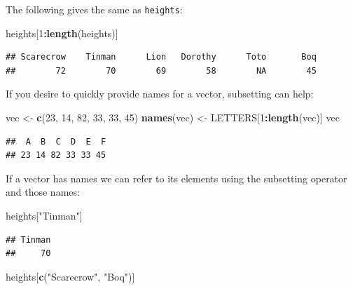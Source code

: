 \documentclass[]{book}
\makeatletter
\newenvironment{Shaded}{\begin{snugshade}}{\end{snugshade}}
\newcommand{\KeywordTok}[1]{\textcolor[rgb]{0.13,0.29,0.53}{\textbf{#1}}}
\newcommand{\DecValTok}[1]{\textcolor[rgb]{0.00,0.00,0.81}{#1}}
\newcommand{\StringTok}[1]{\textcolor[rgb]{0.31,0.60,0.02}{#1}}
\newcommand{\OperatorTok}[1]{\textcolor[rgb]{0.81,0.36,0.00}{\textbf{#1}}}
\newcommand{\NormalTok}[1]{#1}
\newenvironment{kframe}{%
\medskip{}
\setlength{\fboxsep}{.8em}
 \def\at@end@of@kframe{}%
 \ifinner\ifhmode%
  \def\at@end@of@kframe{\end{minipage}}%
  \begin{minipage}{\columnwidth}%
 \fi\fi%
 \def\FrameCommand##1{\hskip\@totalleftmargin \hskip-\fboxsep
 \colorbox{shadecolor}{##1}\hskip-\fboxsep
     \hskip-\linewidth \hskip-\@totalleftmargin \hskip\columnwidth}%
 \MakeFramed {\advance\hsize-\width
   \@totalleftmargin\z@ \linewidth\hsize
   \@setminipage}}%
 {\par\unskip\endMakeFramed%
 \at@end@of@kframe}
\renewenvironment{Shaded}{\begin{kframe}}{\end{kframe}}
\theoremstyle{definition}
\theoremstyle{definition}
\theoremstyle{definition}
\theoremstyle{remark}
\makeatother
\begin{document}
The following gives the same as \texttt{heights}:

\begin{Shaded}
\begin{Highlighting}[]
\NormalTok{heights[}\DecValTok{1}\OperatorTok{:}\KeywordTok{length}\NormalTok{(heights)]}
\end{Highlighting}
\end{Shaded}

\begin{verbatim}
## Scarecrow    Tinman      Lion   Dorothy      Toto       Boq 
##        72        70        69        58        NA        45
\end{verbatim}

If you desire to quickly provide names for a vector, subsetting can
help:

\begin{Shaded}
\begin{Highlighting}[]
\NormalTok{vec <-}\StringTok{ }\KeywordTok{c}\NormalTok{(}\DecValTok{23}\NormalTok{, }\DecValTok{14}\NormalTok{, }\DecValTok{82}\NormalTok{, }\DecValTok{33}\NormalTok{, }\DecValTok{33}\NormalTok{, }\DecValTok{45}\NormalTok{)}
\KeywordTok{names}\NormalTok{(vec) <-}\StringTok{ }\NormalTok{LETTERS[}\DecValTok{1}\OperatorTok{:}\KeywordTok{length}\NormalTok{(vec)]}
\NormalTok{vec}
\end{Highlighting}
\end{Shaded}

\begin{verbatim}
##  A  B  C  D  E  F 
## 23 14 82 33 33 45
\end{verbatim}

If a vector has names we can refer to its elements using the subsetting
operator and those names:

\begin{Shaded}
\begin{Highlighting}[]
\NormalTok{heights[}\StringTok{"Tinman"}\NormalTok{]}
\end{Highlighting}
\end{Shaded}

\begin{verbatim}
## Tinman 
##     70
\end{verbatim}

\begin{Shaded}
\begin{Highlighting}[]
\NormalTok{heights[}\KeywordTok{c}\NormalTok{(}\StringTok{"Scarecrow"}\NormalTok{, }\StringTok{"Boq"}\NormalTok{)]}
\end{Highlighting}
\end{Shaded}
\end{document}
